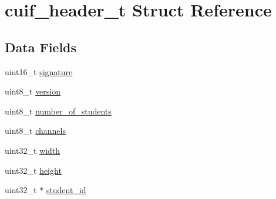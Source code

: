 \hypertarget{structcuif__header__t}{\section{cuif\+\_\+header\+\_\+t Struct Reference}
\label{structcuif__header__t}
}
\subsection*{Data Fields}
\begin{DoxyCompactItemize}
\item 
uint16\+\_\+t \hyperlink{structcuif__header__t_a99e2254e55e8d91e2ccbab0d0325395e}{signature}
\item 
uint8\+\_\+t \hyperlink{structcuif__header__t_a3d18b895c448a38a4e8c5982fac5122e}{version}
\item 
uint8\+\_\+t \hyperlink{structcuif__header__t_a908fcf853f733fa7eb462a2e19bdc9b1}{number\+\_\+of\+\_\+students}
\item 
uint8\+\_\+t \hyperlink{structcuif__header__t_ac9628a6b1399d93a0bc2f71e00dd6847}{channels}
\item 
uint32\+\_\+t \hyperlink{structcuif__header__t_afd0bb120ea431d8cea9dc53885a915cc}{width}
\item 
uint32\+\_\+t \hyperlink{structcuif__header__t_a1a9be7e2655bacdc1854c0782e189bce}{height}
\item 
uint32\+\_\+t $\ast$ \hyperlink{structcuif__header__t_a8a736a8272758a247d99831c5dcb669b}{student\+\_\+id}
\end{DoxyCompactItemize}


